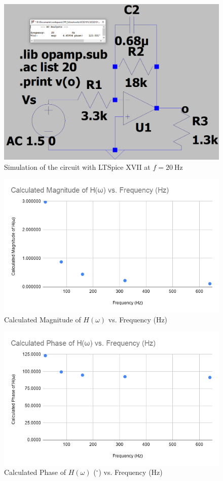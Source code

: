 \documentclass{article}
\begin{document}
\newpage
\begin{figure}[H]
    \centering
        \includegraphics[width=\textwidth]{ECE2101L_Lab11_B1.png}
        \caption{Simulation of the circuit with LTSpice XVII at $f=\SI{20}{\hertz}$}
\end{figure}
\begin{figure}[H]
    \centering
        \includegraphics[scale=0.45]{ECE2101L_Lab11_B1_plot1.png}
        \caption{Calculated Magnitude of $H(\omega)$ vs. Frequency (Hz)}
\end{figure}
\begin{figure}[H]
    \centering
        \includegraphics[scale=0.45]{ECE2101L_Lab11_B1_plot2.png}
        \caption{Calculated Phase of $H(\omega)$ ($^{\circ}$) vs. Frequency (Hz)}
\end{figure}
\end{document}
